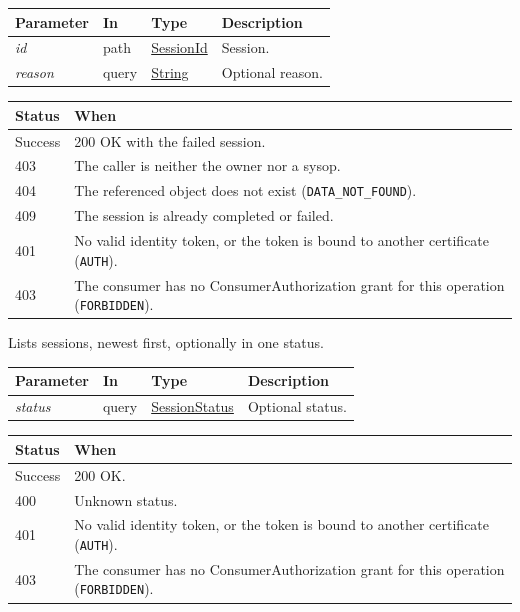 \documentclass[a4paper]{arrowhead}
\newcommand{\fparam}[1]{\textit{\textcolor{ArrowheadBlue}{#1}}}
\newcommand{\mref}[1]{{\textcolor{ArrowheadPurple}{\hyperref[sec:model:#1]{#1}}}}
\newcommand{\pref}[1]{{\textcolor{ArrowheadGrey}{\hyperref[sec:model:primitives:#1]{#1}}}}
\begin{document}
{\small
\begin{longtable}{|p{3.0cm}|p{1.4cm}|p{3.2cm}|p{8.2cm}|}

\hline
\rowcolor{gray!33} Parameter & In & Type & Description \\ \hline
\endhead
\fparam{id} & path & \pref{SessionId} & Session. \\ \hline
\fparam{reason} & query & \pref{String} & Optional reason. \\ \hline
\end{longtable}
}


{\small
\begin{longtable}{|p{2.0cm}|p{13.8cm}|}

\hline
\rowcolor{gray!33} Status & When \\ \hline
\endhead
Success & 200 OK with the failed session. \\ \hline
403 & The caller is neither the owner nor a sysop. \\ \hline
404 & The referenced object does not exist (\texttt{DATA\_NOT\_FOUND}). \\ \hline
409 & The session is already completed or failed. \\ \hline
401 & No valid identity token, or the token is bound to another certificate (\texttt{AUTH}). \\ \hline
403 & The consumer has no ConsumerAuthorization grant for this operation (\texttt{FORBIDDEN}). \\ \hline
\end{longtable}
}

Lists sessions, newest first, optionally in one status.

{\small
\begin{longtable}{|p{3.0cm}|p{1.4cm}|p{3.2cm}|p{8.2cm}|}

\hline
\rowcolor{gray!33} Parameter & In & Type & Description \\ \hline
\endhead
\fparam{status} & query & \mref{SessionStatus} & Optional status. \\ \hline
\end{longtable}
}


{\small
\begin{longtable}{|p{2.0cm}|p{13.8cm}|}

\hline
\rowcolor{gray!33} Status & When \\ \hline
\endhead
Success & 200 OK. \\ \hline
400 & Unknown status. \\ \hline
401 & No valid identity token, or the token is bound to another certificate (\texttt{AUTH}). \\ \hline
403 & The consumer has no ConsumerAuthorization grant for this operation (\texttt{FORBIDDEN}). \\ \hline
\end{longtable}
}
\end{document}

